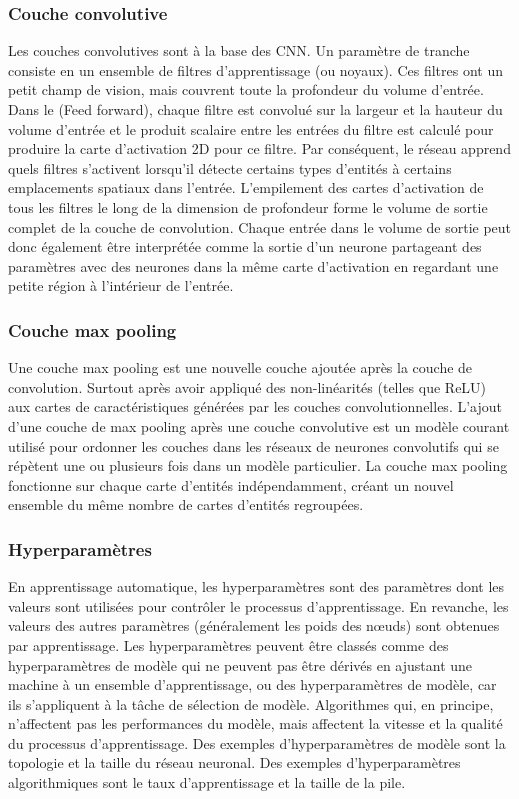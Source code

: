         \subsubsection{Couche convolutive}
        Les couches convolutives sont à la base des CNN. Un paramètre de tranche consiste en un ensemble de filtres d'apprentissage (ou noyaux). Ces filtres ont un petit champ de vision, mais couvrent toute la profondeur du volume d'entrée. Dans le (Feed forward), chaque filtre est convolué sur la largeur et la hauteur du volume d'entrée et le produit scalaire entre les entrées du filtre est calculé pour produire la carte d'activation 2D pour ce filtre. Par conséquent, le réseau apprend quels filtres s'activent lorsqu'il détecte certains types d'entités à certains emplacements spatiaux dans l'entrée. 
        L'empilement des cartes d'activation de tous les filtres le long de la dimension de profondeur forme le volume de sortie complet de la couche de convolution. Chaque entrée dans le volume de sortie peut donc également être interprétée comme la sortie d'un neurone partageant des paramètres avec des neurones dans la même carte d'activation en regardant une petite région à l'intérieur de l'entrée.

        \subsubsection{Couche max pooling}
        Une couche max pooling est une nouvelle couche ajoutée après la couche de convolution. Surtout après avoir appliqué des non-linéarités (telles que ReLU)  aux cartes de caractéristiques générées par les couches convolutionnelles. 
        L'ajout d'une couche de max pooling après une couche convolutive est un modèle courant utilisé pour ordonner les couches dans les réseaux de neurones convolutifs qui se répètent une ou plusieurs fois dans un modèle particulier. 
        La couche max pooling fonctionne sur chaque carte d'entités indépendamment, créant un nouvel ensemble du même nombre de cartes d'entités regroupées.

        
        \subsubsection{Hyperparamètres}
        En apprentissage automatique, les hyperparamètres sont des paramètres dont les valeurs sont utilisées pour contrôler le processus d'apprentissage. En revanche, les valeurs des autres paramètres (généralement les poids des nœuds) sont obtenues par apprentissage. 
        Les hyperparamètres peuvent être classés comme des hyperparamètres de modèle qui ne peuvent pas être dérivés en ajustant une machine à un ensemble d'apprentissage, ou des hyperparamètres de modèle, car ils s'appliquent à la tâche de sélection de  modèle. Algorithmes qui, en principe, n'affectent pas les performances du modèle, mais affectent la vitesse et la qualité du processus d'apprentissage. Des exemples d'hyperparamètres de modèle sont la topologie et la taille du réseau neuronal. Des exemples d'hyperparamètres algorithmiques sont le taux d'apprentissage et la taille de la pile.
